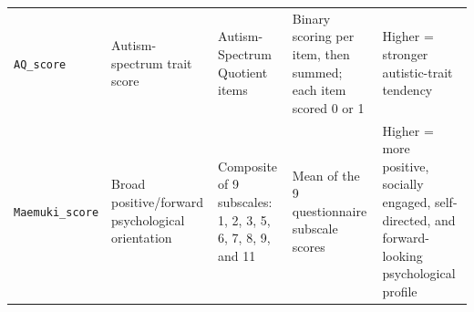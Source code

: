 \begin{longtable}{>{\raggedright\arraybackslash}p{3.6cm}>{\raggedright\arraybackslash}p{2.4cm}>{\raggedright\arraybackslash}p{2.7cm}>{\raggedright\arraybackslash}p{2.5cm}>{\raggedright\arraybackslash}p{3.4cm}}
\texttt{AQ\_score} & Autism-spectrum trait score & 50 Autism-Spectrum Quotient items & Binary scoring per item, then summed; each item scored 0 or 1 & Higher = stronger autistic-trait tendency \\
\texttt{Maemuki\_score} & Broad positive/forward psychological orientation & Composite of 9 subscales: 1, 2, 3, 5, 6, 7, 8, 9, and 11 & Mean of the 9 questionnaire subscale scores & Higher = more positive, socially engaged, self-directed, and forward-looking psychological profile \\
\end{longtable}
\endgroup
